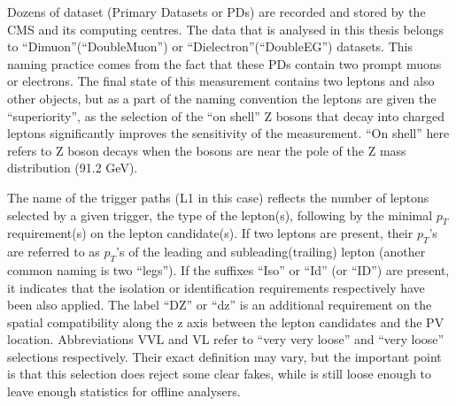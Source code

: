 Dozens of dataset (Primary Datasets or PDs) are recorded and stored by the CMS and its computing centres. The data that is analysed in this thesis belongs to ``Dimuon''(``DoubleMuon'') or ``Dielectron''(``DoubleEG'') datasets. This naming practice comes from the fact that these PDs contain two prompt muons or electrons. The final state of this measurement contains two leptons and also other objects, but as a part of the naming convention the leptons are given the ``superiority'', as the selection of the ``on shell'' Z bosons that decay into charged leptons significantly improves the sensitivity of the measurement. ``On shell'' here refers to Z boson decays when the bosons are near the pole of the Z mass distribution (91.2 GeV). 

The name of the trigger paths (L1 in this case) reflects the number of leptons selected by a given trigger, the type of the lepton(s), following by the minimal $p_T$ requirement(s) on the lepton candidate(s). If two leptons are present, their $p_T$'s are referred to as $p_T$'s of the leading and subleading(trailing) lepton (another common naming is two ``legs''). If the suffixes ``Iso'' or ``Id'' (or ``ID'') are present, it indicates that the isolation or identification requirements respectively have been also applied. The label ``DZ'' or ``dz'' is an additional requirement on the spatial compatibility along the z axis between the lepton candidates and the PV location. Abbreviations VVL and VL refer to ``very very loose'' and ``very loose'' selections respectively. Their exact definition may vary, but the important point is that this selection does reject some clear fakes, while is still loose enough to leave enough statistics for offline analysers. 

